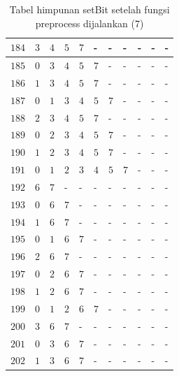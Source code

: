 \begin{appendices}
\begin{table}[H]
\begin{tabular} {|l|l|l|l|l|l|l|l|l|l|l|}
  		$ 184 $ & $ 3 $ &$ 4 $ &$ 5 $ &$ 7 $ & - &  - &  - &  - &  - &  -   \\ \hline
  		$ 185 $ & $ 0 $ &$ 3 $ &$ 4 $ &$ 5 $ &$ 7 $ & - &  - &  - &  - &  -   \\ \hline
  		$ 186 $ & $ 1 $ &$ 3 $ &$ 4 $ &$ 5 $ &$ 7 $ & - &  - &  - &  - &  -   \\ \hline
  		$ 187 $ & $ 0 $ &$ 1 $ &$ 3 $ &$ 4 $ &$ 5 $ &$ 7 $ & - &  - &  - &  -   \\ \hline
  		$ 188 $ & $ 2 $ &$ 3 $ &$ 4 $ &$ 5 $ &$ 7 $ & - &  - &  - &  - &  -   \\ \hline
  		$ 189 $ & $ 0 $ &$ 2 $ &$ 3 $ &$ 4 $ &$ 5 $ &$ 7 $ & - &  - &  - &  -   \\ \hline
  		$ 190 $ & $ 1 $ &$ 2 $ &$ 3 $ &$ 4 $ &$ 5 $ &$ 7 $ & - &  - &  - &  -   \\ \hline
  		$ 191 $ & $ 0 $ &$ 1 $ &$ 2 $ &$ 3 $ &$ 4 $ &$ 5 $ &$ 7 $ & - &  - &  -   \\ \hline
  		$ 192 $ & $ 6 $ &$ 7 $ & - &  - &  - &  - &  - &  - &  - &  -   \\ \hline
  		$ 193 $ & $ 0 $ &$ 6 $ &$ 7 $ & - &  - &  - &  - &  - &  - &  -   \\ \hline
  		$ 194 $ & $ 1 $ &$ 6 $ &$ 7 $ & - &  - &  - &  - &  - &  - &  -   \\ \hline
  		$ 195 $ & $ 0 $ &$ 1 $ &$ 6 $ &$ 7 $ & - &  - &  - &  - &  - &  -   \\ \hline
  		$ 196 $ & $ 2 $ &$ 6 $ &$ 7 $ & - &  - &  - &  - &  - &  - &  -   \\ \hline
  		$ 197 $ & $ 0 $ &$ 2 $ &$ 6 $ &$ 7 $ & - &  - &  - &  - &  - &  -   \\ \hline
  		$ 198 $ & $ 1 $ &$ 2 $ &$ 6 $ &$ 7 $ & - &  - &  - &  - &  - &  -   \\ \hline
  		$ 199 $ & $ 0 $ &$ 1 $ &$ 2 $ &$ 6 $ &$ 7 $ & - &  - &  - &  - &  -   \\ \hline
  		$ 200 $ & $ 3 $ &$ 6 $ &$ 7 $ & - &  - &  - &  - &  - &  - &  -   \\ \hline
  		$ 201 $ & $ 0 $ &$ 3 $ &$ 6 $ &$ 7 $ & - &  - &  - &  - &  - &  -   \\ \hline
  		$ 202 $ & $ 1 $ &$ 3 $ &$ 6 $ &$ 7 $ & - &  - &  - &  - &  - &  -   \\ \hline
  	\end{tabular}\caption{Tabel himpunan setBit setelah fungsi preprocess dijalankan (7)}
  	\label{tab:setbit_7}
  \end{table}
  \begin{table}[H]
  	\centering

\end{table}
\end{appendices}
